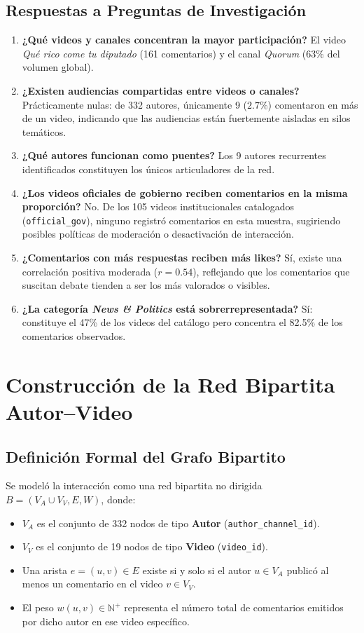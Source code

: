 \documentclass[11pt,a4paper]{article}
\begin{document}
\subsection{Respuestas a Preguntas de Investigación}
\begin{enumerate}
    \item \textbf{¿Qué videos y canales concentran la mayor participación?} El video \textit{Qué rico come tu diputado} (161 comentarios) y el canal \textit{Quorum} (63\% del volumen global).
    \item \textbf{¿Existen audiencias compartidas entre videos o canales?} Prácticamente nulas: de 332 autores, únicamente 9 ($2.7\%$) comentaron en más de un video, indicando que las audiencias están fuertemente aisladas en silos temáticos.
    \item \textbf{¿Qué autores funcionan como puentes?} Los 9 autores recurrentes identificados constituyen los únicos articuladores de la red.
    \item \textbf{¿Los videos oficiales de gobierno reciben comentarios en la misma proporción?} No. De los 105 videos institucionales catalogados (\texttt{official\_gov}), ninguno registró comentarios en esta muestra, sugiriendo posibles políticas de moderación o desactivación de interacción.
    \item \textbf{¿Comentarios con más respuestas reciben más likes?} Sí, existe una correlación positiva moderada ($r = 0.54$), reflejando que los comentarios que suscitan debate tienden a ser los más valorados o visibles.
    \item \textbf{¿La categoría \textit{News \& Politics} está sobrerrepresentada?} Sí: constituye el 47\% de los videos del catálogo pero concentra el 82.5\% de los comentarios observados.
\end{enumerate}

\section{Construcción de la Red Bipartita Autor--Video}

\subsection{Definición Formal del Grafo Bipartito}
Se modeló la interacción como una red bipartita no dirigida $B = (V_A \cup V_V, E, W)$, donde:
\begin{itemize}
    \item $V_A$ es el conjunto de 332 nodos de tipo \textbf{Autor} (\texttt{author\_channel\_id}).
    \item $V_V$ es el conjunto de 19 nodos de tipo \textbf{Video} (\texttt{video\_id}).
    \item Una arista $e = (u, v) \in E$ existe si y solo si el autor $u \in V_A$ publicó al menos un comentario en el video $v \in V_V$.
    \item El peso $w(u, v) \in \mathbb{N}^+$ representa el número total de comentarios emitidos por dicho autor en ese video específico.
\end{itemize}
\end{document}
